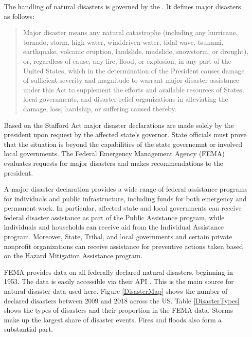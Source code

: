 The handling of natural disasters is governed by the \cite{Stafford}. It defines major disasters as follows:
\begin{quote}
	 Major disaster means any natural catastrophe (including any 	hurricane, tornado, storm, high water, winddriven water, tidal wave, tsunami, earthquake, volcanic eruption, landslide, mudslide, snowstorm, or drought), or, regardless of cause, any fire, flood, or explosion, in any part of the United States, which in the determination of the President causes damage of sufficient severity and magnitude to warrant major disaster assistance under this Act to supplement the efforts and available resources of States, local governments, and disaster relief organizations in alleviating the damage, loss, hardship, or suffering caused thereby.
\end{quote}
Based on the Stafford Act major disaster declarations are made solely by the president upon request by the affected state's governor. State officials must prove that the situation is beyond the capabilities of the state governemnt or involved local governments. The Federal Emergency Management Agency (FEMA) evaluates requests for major disasters and makes recommendations to the president.

A major disaster declaration provides a wide range of federal assistance programs for individuals and public infrastructure, including funds for both emergency and permanent work. In particular, affected state and local governments can receive federal disaster assistance as part of the Public Assistance program, while individuals and households can receive aid from the Individual Assistance program. Moreover, State, Tribal, and local governments and certain private nonprofit organizations can receive assistance for preventive actions taken based on the Hazard Mitigation Assistance program.

FEMA provides data on all federally declared natural disasters, beginning in 1953. The data is easily accessible via their API \citep{rfema}. This is the main source for natural disaster data used here. Figure \ref{DisasterMap} shows the number of declared disasters between 2009 and 2018 across the US. Table \ref{DisasterTypes} shows the types of disasters and their proportion in the FEMA data. Storms make up the largest share of disaster events. Fires and floods also form a substantial part.


